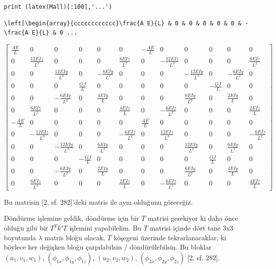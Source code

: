 \documentclass[12pt,fleqn]{article}\usepackage{../../common}
\begin{document}
\begin{verbatim}
print (latex(Mall)[:100],'...')
\end{verbatim}

\begin{verbatim}
\left[\begin{array}{cccccccccccc}\frac{A E}{L} & 0 & 0 & 0 & 0 & 0 & - \frac{A E}{L} & 0 ...
\end{verbatim}

$$
\left[\begin{array}{cccccccccccc}\frac{A E}{L} & 0 & 0 & 0 & 0 & 0 & - \frac{A E}{L} & 0 & 0 & 0 & 0 & 0\\0 & \frac{12 E Iz}{L^{3}} & 0 & 0 & 0 & \frac{6 E Iz}{L^{2}} & 0 & - \frac{12 E Iz}{L^{3}} & 0 & 0 & 0 & \frac{6 E Iz}{L^{2}}\\0 & 0 & \frac{12 E Iy}{L^{3}} & 0 & - \frac{6 E Iy}{L^{2}} & 0 & 0 & 0 & - \frac{12 E Iy}{L^{3}} & 0 & - \frac{6 E Iy}{L^{2}} & 0\\0 & 0 & 0 & \frac{G J}{L} & 0 & 0 & 0 & 0 & 0 & - \frac{G J}{L} & 0 & 0\\0 & 0 & - \frac{6 E Iy}{L^{2}} & 0 & \frac{4 E Iy}{L} & 0 & 0 & 0 & \frac{6 E Iy}{L^{2}} & 0 & \frac{2 E Iy}{L} & 0\\0 & \frac{6 E Iz}{L^{2}} & 0 & 0 & 0 & \frac{4 E Iz}{L} & 0 & - \frac{6 E Iz}{L^{2}} & 0 & 0 & 0 & \frac{2 E Iz}{L}\\- \frac{A E}{L} & 0 & 0 & 0 & 0 & 0 & \frac{A E}{L} & 0 & 0 & 0 & 0 & 0\\0 & - \frac{12 E Iz}{L^{3}} & 0 & 0 & 0 & - \frac{6 E Iz}{L^{2}} & 0 & \frac{12 E Iz}{L^{3}} & 0 & 0 & 0 & - \frac{6 E Iz}{L^{2}}\\0 & 0 & - \frac{12 E Iy}{L^{3}} & 0 & \frac{6 E Iy}{L^{2}} & 0 & 0 & 0 & \frac{12 E Iy}{L^{3}} & 0 & \frac{6 E Iy}{L^{2}} & 0\\0 & 0 & 0 & - \frac{G J}{L} & 0 & 0 & 0 & 0 & 0 & \frac{G J}{L} & 0 & 0\\0 & 0 & - \frac{6 E Iy}{L^{2}} & 0 & \frac{2 E Iy}{L} & 0 & 0 & 0 & \frac{6 E Iy}{L^{2}} & 0 & \frac{4 E Iy}{L} & 0\\0 & \frac{6 E Iz}{L^{2}} & 0 & 0 & 0 & \frac{2 E Iz}{L} & 0 & - \frac{6 E Iz}{L^{2}} & 0 & 0 & 0 & \frac{4 E Iz}{L}\end{array}\right]
$$

Bu matrisin [2, sf. 282]'deki matris ile aynı olduğunu göreceğiz.

Döndürme işlemine geldik, döndürme için bir $T$ matrisi gerekiyor ki daha önce
olduğu gibi bir $T^T k' T$ işlemini yapabilelim. Bu $T$ matrisi içinde dört tane
3x3 boyutunda $\lambda$ matris bloğu olacak, $T$ köşegeni üzerinde
tekrarlanacaklar, ki böylece her değişken bloğu çarpılabilsin /
döndürülebilsin. Bu bloklar $(u_1,v_1,w_1)$, $(\phi_{1x},\phi_{1y},\phi_{1z})$,
$(u_2,v_2,w_2)$, $(\phi_{2x},\phi_{2y},\phi_{2z})$ [2, sf. 282].
\end{document}
